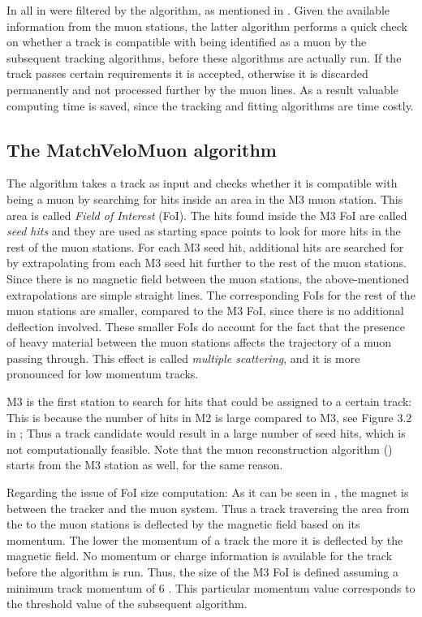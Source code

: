 In \runone all \veloTracks in \hltone were filtered by the \mvm algorithm, as mentioned in .
Given the available information from the muon stations, the latter algorithm performs a quick check on whether a
\velo track is compatible with being identified as a muon by the subsequent tracking algorithms, before these
algorithms are actually run. If the \velo track passes certain requirements it
is accepted, otherwise it is discarded permanently and not processed further by the \hlt muon lines. As a result
valuable computing time is saved, since the \FwD tracking and fitting algorithms are time costly.

\subsection{The MatchVeloMuon algorithm}
\label{sec:muon_matching}

The \mvm algorithm takes a \velo track as input and checks whether it is compatible with being a muon by
searching for hits inside an area in the M3 muon station. This area is called {\it Field of Interest} (FoI).
The hits found inside the M3 FoI are called {\it seed hits} and they are used as starting space points to look
for more hits in the rest of the muon stations. For each M3 seed hit, additional hits are searched for
by extrapolating from each M3 seed hit further to the rest of the muon stations.
Since there is no magnetic field between the muon stations, the above-mentioned extrapolations are simple straight lines.
The corresponding FoIs for the rest of the muon stations are smaller, compared to the M3 FoI, since there
is no additional deflection involved. These smaller FoIs do account for the fact that the presence of heavy material
between the muon stations affects the trajectory of a muon passing through. This effect is called {\it multiple
scattering}, and it is more pronounced for low momentum tracks.

M3 is the first station to search for hits that could be assigned to a certain \velo track: This is because the
number of hits in M2 is large compared to M3, see Figure 3.2 in \cite{roelThesis}; Thus a \velo track
candidate would result in a large number of seed hits, which is not computationally feasible. Note that the muon
reconstruction algorithm (\isMuon) starts from the M3 station as well, for the same reason.

Regarding the issue of FoI size computation: As it can be seen in ,
the \lhcb magnet is between the \velo tracker and the muon system. Thus a track traversing the area from the
\velo to the muon stations is deflected by the magnetic field based on its momentum.  The lower the momentum
of a track the more it is deflected by the magnetic field. No momentum or charge information is available for
the \velo track before the \FwD algorithm is run. Thus, the size of the M3 FoI is defined assuming a minimum
track momentum of 6 \gevc. This particular momentum value corresponds to the threshold value of the subsequent
\isMuon algorithm.

